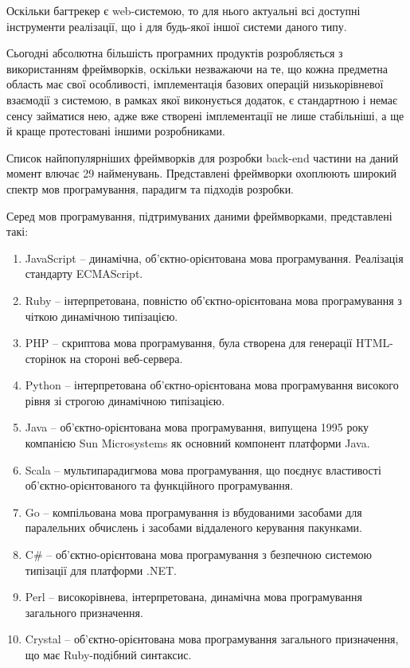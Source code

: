 \documentclass[../main.tex]{subfiles}
\begin{document}
Оскільки багтрекер є web-системою, то для нього актуальні всі доступні інструменти реалізації, що і для будь-якої іншої системи даного типу.

Сьогодні абсолютна більшість програмних продуктів розробляється з використанням фреймворків, оскільки незважаючи на те, що кожна предметна область має свої особливості, імплементація базових операцій низькорівневої взаємодії з системою, в рамках якої виконується додаток, є стандартною і немає сенсу займатися нею, адже вже створені імплементації не лише стабільніші, а ще й краще протестовані іншими розробниками.

Список найпопулярніших фреймворків для розробки back-end частини \cite{web_app_frameworks} на даний момент влючає 29 найменувань. Представлені фреймворки охоплюють широкий спектр мов програмування, парадигм та підходів розробки.

Серед мов програмування, підтримуваних даними фреймворками, представлені такі:
\begin{enumerate}
    \item JavaScript -- динамічна, об'єктно-орієнтована мова програмування. Реалізація стандарту ECMAScript.
    \item Ruby -- інтерпретована, повністю об'єктно-орієнтована мова програмування з чіткою динамічною типізацією.
    \item PHP -- скриптова мова програмування, була створена для генерації HTML-сторінок на стороні веб-сервера.
    \item Python -- інтерпретована об'єктно-орієнтована мова програмування високого рівня зі строгою динамічною типізацією.
    \item Java -- об'єктно-орієнтована мова програмування, випущена 1995 року компанією Sun Microsystems як основний компонент платформи Java.
    \item Scala -- мультипарадигмова мова програмування, що поєднує властивості об'єктно-орієнтованого та функційного програмування.
    \item Go -- компільована мова програмування із вбудованими засобами для паралельних обчислень і засобами віддаленого керування пакунками.
    \item C\# -- об'єктно-орієнтована мова програмування з безпечною системою типізації для платформи .NET.
    \item Perl -- високорівнева, інтерпретована, динамічна мова програмування загального призначення.
    \item Crystal -- об'єктно-орієнтована мова програмування загального призначення, що має Ruby-подібний синтаксис.
\end{enumerate}
\end{document}
